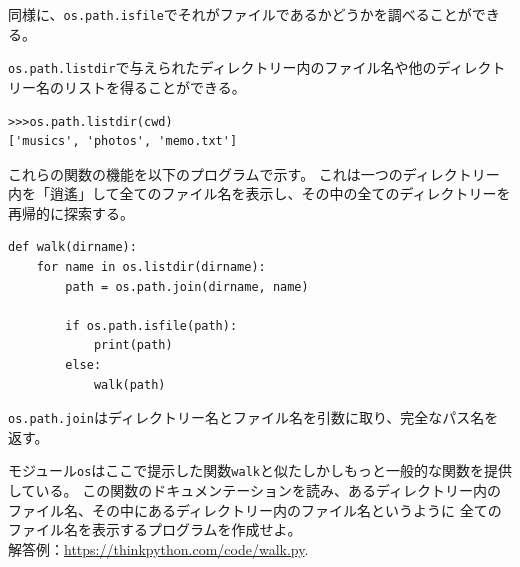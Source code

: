 \documentclass[a4j,12pt,makeidx]{jbook}
\begin{document}
同様に、{\tt os.path.isfile}でそれがファイルであるかどうかを調べることができる。\par
{\tt os.path.listdir}で与えられたディレクトリー内のファイル名や他のディレクトリー名のリストを得ることができる。
\begin{verbatim}
>>>os.path.listdir(cwd)
['musics', 'photos', 'memo.txt']
\end{verbatim} \par
これらの関数の機能を以下のプログラムで示す。
これは一つのディレクトリー内を「逍遙」して全てのファイル名を表示し、その中の全てのディレクトリーを再帰的に探索する。
\begin{verbatim}
def walk(dirname):
    for name in os.listdir(dirname):
        path = os.path.join(dirname, name)

        if os.path.isfile(path):
            print(path)
        else:
            walk(path)
\end{verbatim}
{\tt os.path.join}はディレクトリー名とファイル名を引数に取り、完全なパス名を返す。 \par
モジュール{\tt os}はここで提示した関数{\tt walk}と似たしかしもっと一般的な関数を提供している。
この関数のドキュメンテーションを読み、あるディレクトリー内のファイル名、その中にあるディレクトリー内のファイル名というように
全てのファイル名を表示するプログラムを作成せよ。\\
解答例：\url{https://thinkpython.com/code/walk.py}.
%
\end{document}
